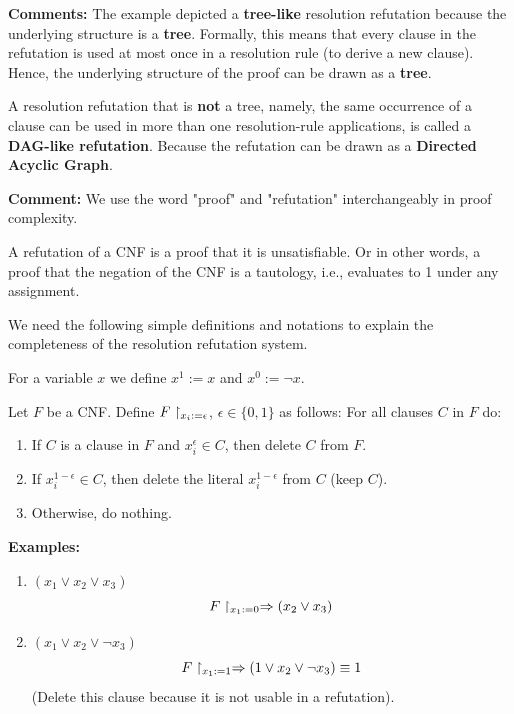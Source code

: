\textbf{Comments:} The example depicted a \textbf{tree-like} resolution refutation because the underlying structure is a \textbf{tree}. Formally, this means that every clause in the refutation is used at most once in a resolution rule (to derive a new clause). Hence, the underlying structure of the proof can be drawn as a \textbf{tree}.

A resolution refutation that is \textbf{not} a tree, namely, the same occurrence of a clause can be used in more than one resolution-rule applications, is called a \textbf{DAG-like refutation}. Because the refutation can be drawn as a \textbf{Directed Acyclic Graph}.


\textbf{Comment:} We use the word "proof" and "refutation" interchangeably in proof complexity.

A refutation of a CNF is a proof that it is unsatisfiable. Or in other words, a proof that the negation of the CNF is a tautology, i.e., evaluates to 1 under any assignment.


We need the following simple definitions and notations to explain the completeness of the resolution refutation system.

For a variable $x$ we define $x^1 := x$ and $x^0 := \neg x$.
 

\begin{definition}
Let $F$ be a CNF.
Define $F\upharpoonright_{x_i := \epsilon}$, $\epsilon \in \{0,1\}$ as follows:
For all clauses $C$ in $F$ do:
\begin{enumerate}
    \item If $C$ is a clause in $F$ and $x_i^\epsilon \in C$, then delete $C$ from $F$.
    \item If $x_i^{1-\epsilon} \in C$, then delete the literal $x_i^{1-\epsilon}$ from $C$ (keep $C$).
    \item Otherwise, do nothing.
\end{enumerate}
\end{definition}

\textbf{Examples:}
\begin{enumerate}
    \item $(x_1 \lor x_2 \lor x_3)$  
    \[
    F\upharpoonright_{x_1 := 0} \Rightarrow (x_2 \lor x_3)
    \]

    \item $(x_1 \lor x_2 \lor \neg x_3)$  
    \[
    F\upharpoonright_{x_1 := 1} \Rightarrow (1\lor x_2 \lor \neg x_3)\equiv 1
    \]
    (Delete this clause  because it is not usable in a refutation).
\end{enumerate}

